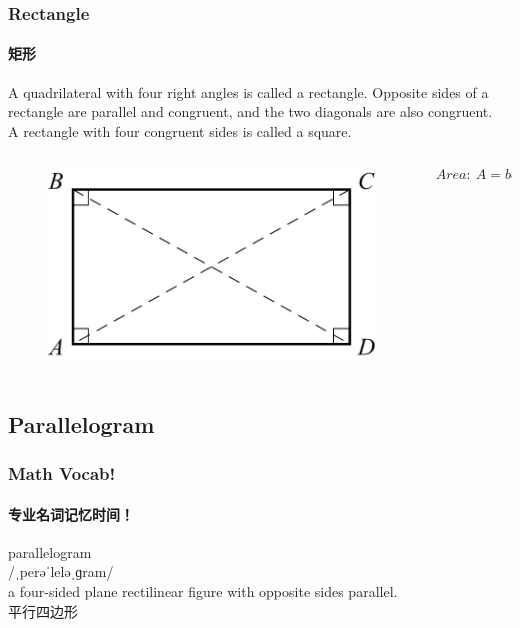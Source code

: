 \documentclass[
	11pt, %
]{beamer}
\begin{document}
\begin{frame}
	\frametitle{Rectangle} %
	\framesubtitle{矩形}
	\begin{definition}
		A quadrilateral with four right angles is called a rectangle.
Opposite sides of a rectangle are parallel and congruent, and the two
diagonals are also congruent. \\
A rectangle with four congruent sides is called a square.
	\end{definition}

	\begin{columns}[t] 
		\begin{column}{0.5\textwidth} %
			\begin{figure}
				\includegraphics[width=\linewidth]{Retangle.jpg}
			\end{figure}
		\end{column}
		\begin{column}{0.5\textwidth} %
			\begin{equation*}
				Area:\ A = base \cdot height
			\end{equation*}
		\end{column}
	\end{columns}
\end{frame}


\subsection{Parallelogram}


\begin{frame}
	\frametitle{Math Vocab!} %
	\framesubtitle{专业名词记忆时间！}
	
	{\Huge parallelogram}\\
	{\LARGE /ˌperəˈleləˌɡram/\\
		\bigskip\bigskip
	a four-sided plane rectilinear figure with opposite sides parallel. \\ 
	平行四边形}

\end{frame}
\end{document}
